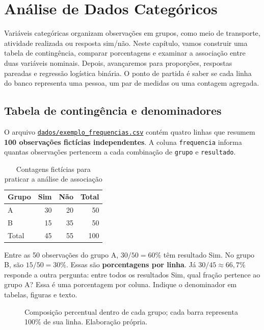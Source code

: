 \chapter{Análise de Dados Categóricos}
\label{cap:categoricos}

Variáveis categóricas organizam observações em grupos, como meio de transporte, atividade realizada ou resposta sim/não. Neste capítulo, vamos construir uma tabela de contingência, comparar porcentagens e examinar a associação entre duas variáveis nominais. Depois, avançaremos para proporções, respostas pareadas e regressão logística binária. O ponto de partida é saber se cada linha do banco representa uma pessoa, um par de medidas ou uma contagem agregada.

\section{Tabela de contingência e denominadores}

O arquivo \href{https://github.com/erickfaria/apostilaJamovi/blob/main/dados/exemplo_frequencias.csv}{\texttt{dados/exemplo\_frequencias.csv}} contém quatro linhas que resumem \textbf{100 observações fictícias independentes}. A coluna \texttt{frequencia} informa quantas observações pertencem a cada combinação de \texttt{grupo} e \texttt{resultado}.

\begin{table}[H]
\centering
\caption{Contagens fictícias para praticar a análise de associação}
\begin{tabular}{lrrr}
\hline
Grupo & Sim & Não & Total \\
\hline
A & 30 & 20 & 50 \\
B & 15 & 35 & 50 \\
\hline
Total & 45 & 55 & 100 \\
\hline
\end{tabular}
\label{tab:contingencia-exemplo}
\end{table}

Entre as 50 observações do grupo A, $30/50=60\%$ têm resultado Sim. No grupo B, são $15/50=30\%$. Essas são \textbf{porcentagens por linha}. Já $30/45\approx66{,}7\%$ responde a outra pergunta: entre todos os resultados Sim, qual fração pertence ao grupo A? Essa é uma porcentagem por coluna. Indique o denominador em tabelas, figuras e texto.

\begin{figure}[H]
\centering
{}
\caption{Composição percentual dentro de cada grupo; cada barra representa 100\% de sua linha. Elaboração própria.}
\label{fig:proporcoes-grupos}
\end{figure}

